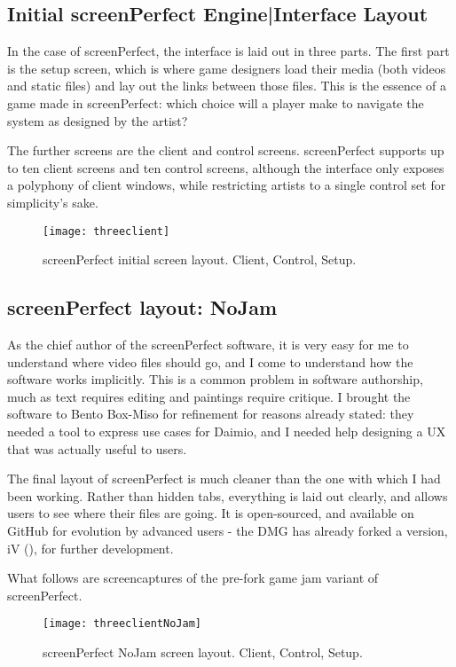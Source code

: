 \subsection{Initial screenPerfect Engine|Interface Layout}
In the case of screenPerfect, the interface is laid out in three parts. The first part is the setup screen, which is where game designers load their media (both videos and static files) and lay out the links between those files. This is the essence of a game made in screenPerfect: which choice will a player make to navigate the system as designed by the artist?

The further screens are the client and control screens. screenPerfect supports up to ten client screens and ten control screens, although the interface only exposes a polyphony of client windows, while restricting artists to a single control set for simplicity's sake.

\begin{figure}[h]
  \caption{screenPerfect initial screen layout. Client, Control, Setup.}
  \centering
    \texttt{[image: threeclient]}
\end{figure}

\subsection{screenPerfect layout: NoJam}

As the chief author of the screenPerfect software, it is very easy for me to understand where video files should go, and I come to understand how the software works implicitly. This is a common problem in software authorship, much as text requires editing and paintings require critique. I brought the software to Bento Box-Miso for refinement for reasons already stated: they needed a tool to express use cases for Daimio, and I needed help designing a UX that was actually useful to users.

The final layout of screenPerfect is much cleaner than the one with which I had been working. Rather than hidden tabs, everything is laid out clearly, and allows users to see where their files are going. It is open-sourced, and available on GitHub for evolution by advanced users - the DMG has already forked a version, iV (\parencite{daimio}), for further development.

What follows are screencaptures of the pre-fork game jam variant of screenPerfect.

\begin{figure}[h]
  \caption{screenPerfect NoJam screen layout. Client, Control, Setup.}
  \centering
    \texttt{[image: threeclientNoJam]}
\end{figure}

